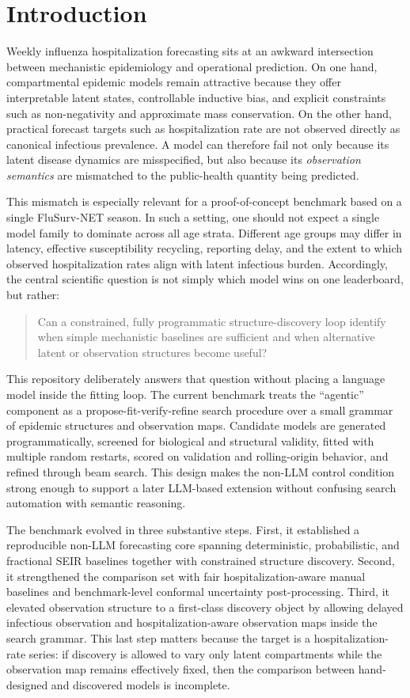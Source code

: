 \section{Introduction}

Weekly influenza hospitalization forecasting sits at an awkward intersection
between mechanistic epidemiology and operational prediction. On one hand,
compartmental epidemic models remain attractive because they offer interpretable
latent states, controllable inductive bias, and explicit constraints such as
non-negativity and approximate mass conservation. On the other hand, practical
forecast targets such as hospitalization rate are not observed directly as
canonical infectious prevalence. A model can therefore fail not only because
its latent disease dynamics are misspecified, but also because its
\emph{observation semantics} are mismatched to the public-health quantity being
predicted.

This mismatch is especially relevant for a proof-of-concept benchmark based on
a single FluSurv-NET season. In such a setting, one should not expect a single
model family to dominate across all age strata. Different age groups may differ
in latency, effective susceptibility recycling, reporting delay, and the extent
to which observed hospitalization rates align with latent infectious burden.
Accordingly, the central scientific question is not simply which model wins on
one leaderboard, but rather:
\begin{quote}
Can a constrained, fully programmatic structure-discovery loop identify when
simple mechanistic baselines are sufficient and when alternative latent or
observation structures become useful?
\end{quote}

This repository deliberately answers that question without placing a language
model inside the fitting loop. The current benchmark treats the ``agentic''
component as a propose-fit-verify-refine search procedure over a small grammar
of epidemic structures and observation maps. Candidate models are generated
programmatically, screened for biological and structural validity, fitted with
multiple random restarts, scored on validation and rolling-origin behavior, and
refined through beam search. This design makes the non-LLM control condition
strong enough to support a later LLM-based extension without confusing search
automation with semantic reasoning.

The benchmark evolved in three substantive steps. First, it established a
reproducible non-LLM forecasting core spanning deterministic, probabilistic,
and fractional SEIR baselines together with constrained structure discovery.
Second, it strengthened the comparison set with fair hospitalization-aware
manual baselines and benchmark-level conformal uncertainty post-processing.
Third, it elevated observation structure to a first-class discovery object by
allowing delayed infectious observation and hospitalization-aware observation
maps inside the search grammar. This last step matters because the target is a
hospitalization-rate series: if discovery is allowed to vary only latent
compartments while the observation map remains effectively fixed, then the
comparison between hand-designed and discovered models is incomplete.

